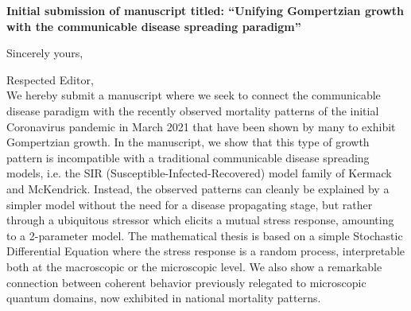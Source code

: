 \documentclass[11pt,a4paper,roman]{moderncv}
\begin{document}
\date{\today}
\opening{\textbf{Initial submission of manuscript titled: ``Unifying Gompertzian growth with the communicable disease spreading paradigm''}}
\closing{Sincerely yours, \vspace{-1em}}


\makelettertitle



Respected Editor,
\\
\vspace{1em}
We hereby submit a manuscript where we seek to connect the communicable disease paradigm with the recently observed mortality patterns of the initial Coronavirus pandemic in March 2021 that have been shown by many to exhibit Gompertzian growth. 
In the manuscript, we show that this type of growth pattern is incompatible with a traditional communicable disease spreading models, i.e. the SIR (Susceptible-Infected-Recovered) model family of Kermack and McKendrick. Instead, the observed patterns can cleanly be explained by a simpler model without the need for a disease propagating stage, but rather through a ubiquitous stressor which elicits a mutual stress response, amounting to a 2-parameter model. 
The mathematical thesis is based on a simple Stochastic Differential Equation where the stress response is a random process, interpretable both at the macroscopic or the microscopic level. 
We also show a remarkable connection between coherent behavior previously relegated to microscopic quantum domains, now exhibited in national mortality patterns.
\end{document}
